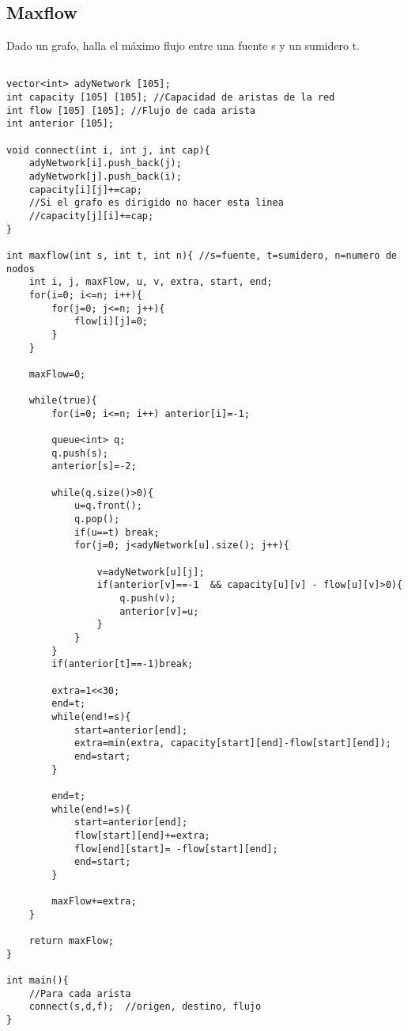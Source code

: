 \documentclass[11pt,letterpaper,twocolumn,twosided]{article}
\begin{document}
\subsection{Maxflow}
Dado un grafo, halla el m\'aximo flujo entre una fuente s y un sumidero t.
\begin{lstlisting}

vector<int> adyNetwork [105]; 
int capacity [105] [105]; //Capacidad de aristas de la red
int flow [105] [105]; //Flujo de cada arista
int anterior [105];

void connect(int i, int j, int cap){
    adyNetwork[i].push_back(j);
    adyNetwork[j].push_back(i);
    capacity[i][j]+=cap;
    //Si el grafo es dirigido no hacer esta linea
    //capacity[j][i]+=cap;
}

int maxflow(int s, int t, int n){ //s=fuente, t=sumidero, n=numero de nodos
    int i, j, maxFlow, u, v, extra, start, end;
    for(i=0; i<=n; i++){
        for(j=0; j<=n; j++){
            flow[i][j]=0;
        }
    }

    maxFlow=0;

    while(true){
        for(i=0; i<=n; i++) anterior[i]=-1;

        queue<int> q;
        q.push(s);
        anterior[s]=-2;

        while(q.size()>0){
            u=q.front();
            q.pop();
            if(u==t) break;
            for(j=0; j<adyNetwork[u].size(); j++){
                
                v=adyNetwork[u][j];
                if(anterior[v]==-1  && capacity[u][v] - flow[u][v]>0){
                    q.push(v);
                    anterior[v]=u;
                }
            }
        }
        if(anterior[t]==-1)break;

        extra=1<<30;
        end=t;
        while(end!=s){
            start=anterior[end];
            extra=min(extra, capacity[start][end]-flow[start][end]);
            end=start;
        }

        end=t;
        while(end!=s){
            start=anterior[end];
            flow[start][end]+=extra;
            flow[end][start]= -flow[start][end];
            end=start;
        }

        maxFlow+=extra;
    }

    return maxFlow;
}

int main(){
    //Para cada arista
    connect(s,d,f);  //origen, destino, flujo
}

\end{lstlisting}
\end{document}
